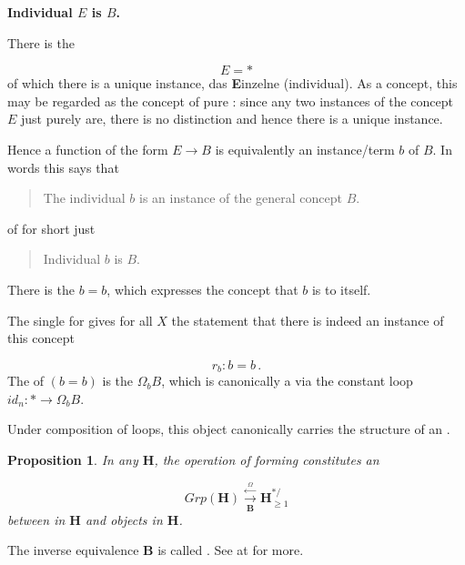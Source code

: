 \documentclass[12pt,titlepage]{article}
\theoremstyle{plain}
\newtheorem{prop}{Proposition}
\theoremstyle{definition}
\theoremstyle{remark}
\begin{document}
\textbf{Individual $E$ is $B$.}

There is the 

\begin{displaymath}
E = \ast
\end{displaymath}
of which there is a unique instance, das \textbf{E}inzelne (individual). As a concept, this may be regarded as the concept of pure : since any two instances of the concept $E$ just purely are, there is no distinction and hence there is a unique instance.

Hence a function of the form $E \longrightarrow B$ is equivalently an instance/term $b$ of $B$. In words this says that

\begin{quote}%
The individual $b$ is an instance of the general concept $B$.


\end{quote}
of for short just

\begin{quote}%
Individual $b$ is $B$.


\end{quote}
There is the  $b = b$, which expresses the concept that $b$ is  to itself.

The single  for  gives for all $X$ the statement that there is indeed an instance of this concept

\begin{displaymath}
r_b \colon b = b
  \,.
\end{displaymath}
The  of $(b = b)$ is the  $\Omega_b B$, which is canonically a  via the constant loop $id_n \colon \ast \to \Omega_b B$.

Under composition of loops, this object canonically carries the structure of an .

\begin{prop}
\label{LoopingDeloopingTheorem}\hypertarget{LoopingDeloopingTheorem}{}
In any  $\mathbf{H}$, the operation of forming  constitutes an 

\begin{displaymath}
Grp(\mathbf{H})
   \stackrel{\overset{\Omega}{\longleftarrow}}{\underset{\mathbf{B}}{\longrightarrow}}
  \mathbf{H}^{\ast/}_{\geq 1}
\end{displaymath}
between  in $\mathbf{H}$ and   objects in $\mathbf{H}$.

\end{prop}
The inverse equivalence $\mathbf{B}$ is called \emph{}. See at \emph{} for more.
\end{document}
